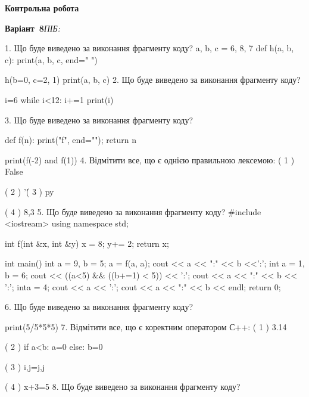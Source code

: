 \documentclass[11pt]{article}
\begin{document}
{\large\textbf{Контрольна робота}}

\textbf{Варіант \No\,8}\hfill \textit{ПІБ:}\,\underline{\hspace{60mm}}
\vspace{4mm}

1. Що буде виведено за виконання фрагменту коду?
a, b, c = 6, 8, 7
def h(a, b, c):
    print(a, b, c, end=" ")

h(b=0, c=2, 1)
print(a, b, c)
\vspace{5mm}
2. Що буде виведено за виконання фрагменту коду?

i=6
while i<12:
    i+=1
print(i)

\vspace{5mm}
3. Що буде виведено за виконання фрагменту коду?

def f(n):
    print("f", end="");
    return n

print(f(-2) and f(1))
\vspace{5mm}
4. %
Відмітити все, що є однією правильною лексемою:
( 1 ) False

( 2 ) '\'

( 3 ) py

( 4 ) 8,3
\vspace{5mm}
5. Що буде виведено за виконання фрагменту коду?
#include <iostream>
using namespace std;

int f(int &x, int &y){
    x = 8;
    y+= 2;
    return x;
}

int main(){
    int a = 9, b = 5;
    a = f(a, a);
    cout << a << ":" << b <<':';
    {
        int a = 1, b = 6;
        cout << ((a<5) && ((b+=1) < 5)) << ':';
        cout << a << ":" << b << ':';
    }
    {
        inta = 4;
        cout << a << ':';
    }
    cout << a << ":" << b << endl;
    return 0;
}

\vspace{5mm}
6. Що буде виведено за виконання фрагменту коду?

print(5/5*5*5)
\vspace{5mm}
7. %
Відмітити все, що є коректним оператором С++:
( 1 ) 3.14%

( 2 ) if a<b: a=0 else: b=0

( 3 ) i,j=j,j

( 4 ) x+3=5
\vspace{5mm}
8. Що буде виведено за виконання фрагменту коду?
\end{document}
